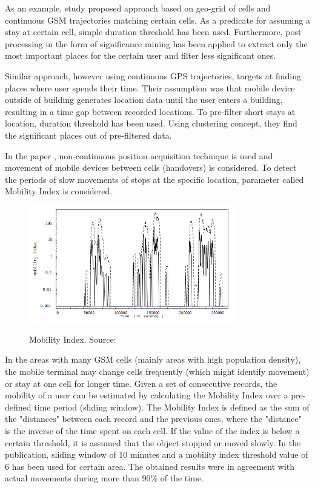 As an example, study \cite{StopDet2} proposed approach based on geo-grid of cells and continuous GSM trajectories matching certain cells. As a predicate for assuming a stay at certain cell, simple duration threshold has been used. Furthermore, post processing in the form of significance mining has been applied to extract only the most important places for the certain user and filter less significant ones. 

Similar approach, however using continuous GPS trajectories, targets at finding places where user
spends their time. Their assumption was that mobile device outside of building generates location data until the user enters a building, resulting in a time gap between recorded locations. To pre-filter short stays at location, duration threshold has been used. Using clustering concept, they find the significant places out of pre-filtered data.  

In the paper \cite{MobilityIndexGIS}, non-continuous position acquisition technique is used and movement of mobile devices between cells (handovers) is considered. To detect the periods of slow movements of stops at the specific location, parameter called Mobility Index is considered. 

\begin{figure}[!ht]
	\centering
	\includegraphics[width=0.8\textwidth]{images/intro_mobility_index.png}\\
	\caption{Mobility Index. Source: \cite{MobilityIndexGIS}}
	\label{fig:introduction_mob_index}
\end{figure}

In the areas with many GSM cells (mainly areas with high population density), the mobile
terminal may change cells frequently (which might identify movement) or stay at one cell for longer time. Given a set of consecutive records, the mobility of a user can be estimated by calculating the Mobility Index over a pre-defined time period (sliding window). The Mobility Index is defined as the sum of the "distances" between each record and the previous ones, where the "distance" is the inverse of the time spent on each cell. If the value of the index is below a certain threshold, it is assumed that the object stopped or moved slowly. In the publication, sliding window of 10 minutes and a mobility index threshold value of 6 has been used for certain area. The obtained results were in agreement with actual movements during more than 90\% of the time.

